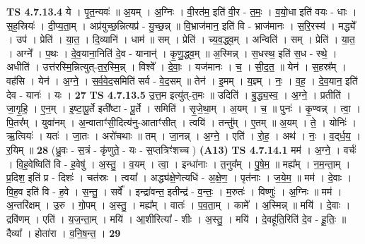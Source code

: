\documentclass[17pt]{extarticle}
\begin{document}
                  \newline
                                \textbf{ TS 4.7.13.4} \newline
                  ये । पृ॒त॒न्यवः॑ ॥ अ॒यम् । अ॒ग्निः । वी॒रत॑म॒ इति॑ वी॒र - त॒मः॒ । व॒यो॒धा इति॑ वयः - धाः । स॒ह॒स्रियः॑ । दी॒प्य॒ता॒म् । अप्र॑युच्छ॒न्नित्यप्र॑ - यु॒च्छ॒न्न् ॥ वि॒भ्राज॑मान॒ इति॑ वि - भ्राज॑मानः । स॒रि॒रस्य॑ । मद्ध्ये᳚ । उप॑ । प्रेति॑ । या॒त॒ । दि॒व्यानि॑ । धाम॑ ॥ सम् । प्रेति॑ । च्य॒व॒द्ध्व॒म् । अन्विति॑ । सम् । प्रेति॑ । या॒त॒ । अग्ने᳚ । प॒थः । दे॒व॒याना॒निति॑ दे॒व - यानान्॑ । कृ॒णु॒द्ध्व॒म् ॥ अ॒स्मिन्न् । स॒धस्थ॒ इति॑ स॒ध - स्थे॒ । अधीति॑ । उत्त॑रस्मि॒न्नित्युत्-त॒र॒स्मि॒न्न् । विश्वे᳚ । दे॒वाः॒ । यज॑मानः । च॒ । सी॒द॒त॒ ॥ येन॑ । स॒हस्र᳚म् । वह॑सि । येन॑ । अ॒ग्ने॒ । स॒र्व॒वे॒द॒समिति॑ सर्व - वे॒द॒सम् ॥ तेन॑ । इ॒मम् । य॒ज्ञ्म् । नः॒ । व॒ह॒ । दे॒व॒यान॒ इति॑ देव - यानः॑ । यः । \textbf{  27} \newline
                  \newline
                                \textbf{ TS 4.7.13.5} \newline
                  उ॒त्त॒म इत्यु॑त्-त॒मः ॥ उदिति॑ । बु॒द्ध्य॒स्व॒ । अ॒ग्ने॒ । प्रतीति॑ । जा॒गृ॒हि॒ । ए॒न॒म् । इ॒ष्टा॒पू॒र्ते इती᳚ष्टा - पू॒र्ते । समिति॑ । सृ॒जे॒था॒म् । अ॒यम् । च॒ ॥ पुनः॑ । कृ॒ण्वन्न् । त्वा॒ । पि॒तर᳚म् । युवा॑नम् । अ॒न्वाताꣳ॑सी॒दित्य॑नु-आताꣳ॑सीत् । त्वयि॑ । तन्तु᳚म् । ए॒तम् ॥ अ॒यम् । ते॒ । योनिः॑ । ऋ॒त्वियः॑ । यतः॑ । जा॒तः । अरो॑चथाः ॥ तम् । जा॒नन्न् । अ॒ग्ने॒ । एति॑ । रो॒ह॒ । अथ॑ । नः॒ । व॒द्‌र्ध॒य॒ । र॒यिम् ॥ \textbf{  28} \newline
                  \newline
                      (ध्रु॒वः - स॒त्रं - कृ॑णुते॒ - यः - स॒प्तत्रिꣳ॑शच्च )  \textbf{(A13)} \newline \newline
                                \textbf{ TS 4.7.14.1} \newline
                  मम॑ । अ॒ग्ने॒ । वर्चः॑ । वि॒ह॒वेष्विति॑ वि - ह॒वेषु॑ । अ॒स्तु॒ । व॒यम् । त्वा॒ । इन्धा॑नाः । त॒नुव᳚म् । पु॒षे॒म॒ ॥ मह्य᳚म् । न॒म॒न्ता॒म् । प्र॒दिश॒ इति॑ प्र - दिशः॑ । चत॑स्रः । त्वया᳚ । अद्ध्य॑क्षे॒णेत्यधि॑ - अ॒क्षे॒ण॒ । पृत॑नाः । ज॒ये॒म॒ ॥ मम॑ । दे॒वाः । वि॒ह॒व इति॑ वि - ह॒वे । स॒न्तु॒ । सर्वे᳚ । इन्द्रा॑वन्त॒ इतीन्द्र॑ - व॒न्तः॒ । म॒रुतः॑ । विष्णुः॑ । अ॒ग्निः ॥ मम॑ । अ॒न्तरि॑क्षम् । उ॒रु । गो॒पम् । अ॒स्तु॒ । मह्य᳚म् । वातः॑ । प॒व॒ता॒म् । कामे᳚ । अ॒स्मिन्न् ॥ मयि॑ । दे॒वाः । द्रवि॑णम् । एति॑ । य॒ज॒न्ता॒म् । मयि॑ । आ॒शीरित्या᳚ - शीः । अ॒स्तु॒ । मयि॑ । दे॒वहू॑ति॒रिति॑ दे॒व - हू॒तिः॒ ॥ दैव्या᳚ । होता॑रा । व॒नि॒ष॒न्त॒ । \textbf{  29} \newline
\end{document}
